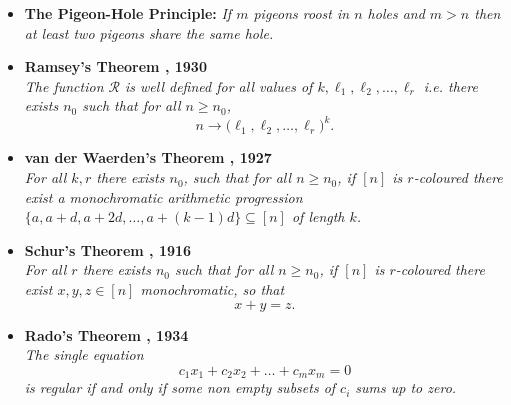 \documentclass[12pt]{report}
\def\R{\mathcal R}
\def\l{\ell}
\begin{document}
\begin{itemize}
\item
\textbf{The Pigeon-Hole Principle:} \textit{If $m$ pigeons roost in $n$ holes and $m>n$ then at least two pigeons share the same hole.}
\item
\textbf{Ramsey's Theorem \cite{RT}, 1930} \\[5pt]  
\textit{The function $\R$ is well defined for all values of $k,\l_1,\l_2, \ldots ,\l_r$ i.e. there exists $n_0$ such that for all $n \geq n_0$,}
\[ n \rightarrow \big(\l_{1},\l_{2}, \ldots,\l_{r}\big)^k. \]
\item
\textbf{van der Waerden's Theorem \cite{VVW}, 1927}\\[5pt]  
\textit{For all $k, r$ there exists $n_0$, such that for all $n \geq n_0$, if $[n]$ is $r$-coloured there exist a monochromatic arithmetic progression $\big\{a, a+d, a+2d, \ldots , a+(k-1)d\big\} \subseteq [n]$ of length $k$.}
\item
\textbf{Schur's Theorem \cite{IS}, 1916} \\[5pt]  
\textit{For all $r$ there exists $n_0$ such that for all $n \geq n_0$, if $[n]$ is $r$-coloured there exist $x,y,z\in [n]$ monochromatic, so that}
\[ x+y = z. \]
\item
\textbf{Rado's Theorem \cite{Rado1}, 1934} \\[5pt]  
\textit{The single equation} 
\[ c_1x_1 + c_2x_2 + \ldots +c_mx_m = 0 \]
\textit{is regular if and only if some non empty subsets of $c_i$ sums up to zero.}
\end{itemize}
\end{document}
